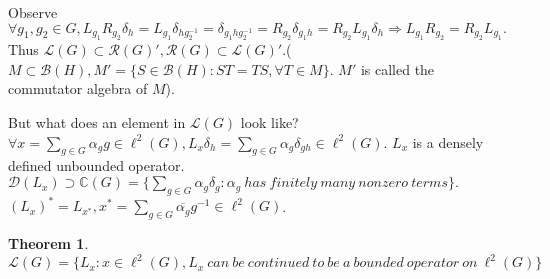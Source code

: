 \documentclass[12pt]{article}
\newtheorem{theorem}{Theorem}
\begin{document}
Observe $\forall g_1,g_2\in G, L_{g_1}R_{g_2}\delta_h=L_{g_1}\delta_{hg_2^{-1}}=\delta_{g_1hg_2^{-1}}=R_{g_2}\delta_{g_1h}=R_{g_2}L_{g_1}\delta_h\Rightarrow L_{g_1}R_{g_2}=R_{g_2}L_{g_1} .$ Thus $\mathcal L(G)\subset \mathcal R(G)',\mathcal R(G)\subset \mathcal L(G)'$.($M\subset \mathcal B(H),M'=\{S\in\mathcal B(H):ST=TS,\forall T\in M \}.$ $M'$ is called the commutator algebra of $M$). 

But what does an element in $\mathcal L(G)$ look like? $\forall x=\sum_{g\in G} \alpha_gg \in \ell^2(G), L_x\delta_h=\sum_{g\in G} \alpha_g\delta_{gh}\in\ell^2(G).$ $L_x$ is a densely defined unbounded operator. $\mathcal D(L_x)\supset \mathbb C(G) = \{\sum_{g\in G}\alpha_g\delta_g:\alpha_g\ has\ finitely\ many\ nonzero\ terms \}.$ $(L_x)^*=L_{x^*}, x^*=\sum_{g\in G}\overline{\alpha_g}g^{-1}\in\ell^2(G)$. 
\begin{theorem}
$\mathcal L(G)=\{L_x: x\in \ell^2(G),L_x\ can\ be\ continued\ to\ be\ a\ bounded\ operator\ on\ \ell^2(G) \} $
\end{theorem}
\end{document}
